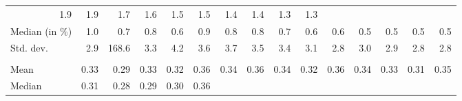 \begin{tabular}{lllllllllllllll}
  \multicolumn{1}{r}{1.9} &
  \multicolumn{1}{r}{1.9} &
  \multicolumn{1}{r}{1.7} &
  \multicolumn{1}{r}{1.6} &
  \multicolumn{1}{r}{1.5} &
  \multicolumn{1}{r}{1.5} &
  \multicolumn{1}{r}{1.4} &
  \multicolumn{1}{r}{1.4} &
  \multicolumn{1}{r}{1.3} &
  \multicolumn{1}{r}{1.3} \\
\multicolumn{1}{l}{\hspace{2em}Median (in $\%$)} &
  \multicolumn{1}{|r}{1.0} &
  \multicolumn{1}{r}{0.7} &
  \multicolumn{1}{r}{0.8} &
  \multicolumn{1}{r}{0.6} &
  \multicolumn{1}{r}{0.9} &
  \multicolumn{1}{r}{0.8} &
  \multicolumn{1}{r}{0.8} &
  \multicolumn{1}{r}{0.7} &
  \multicolumn{1}{r}{0.6} &
  \multicolumn{1}{r}{0.6} &
  \multicolumn{1}{r}{0.5} &
  \multicolumn{1}{r}{0.5} &
  \multicolumn{1}{r}{0.5} &
  \multicolumn{1}{r}{0.5} \\
\multicolumn{1}{l}{\hspace{2em}Std. dev.} &
  \multicolumn{1}{|r}{2.9} &
  \multicolumn{1}{r}{168.6} &
  \multicolumn{1}{r}{3.3} &
  \multicolumn{1}{r}{4.2} &
  \multicolumn{1}{r}{3.6} &
  \multicolumn{1}{r}{3.7} &
  \multicolumn{1}{r}{3.5} &
  \multicolumn{1}{r}{3.4} &
  \multicolumn{1}{r}{3.1} &
  \multicolumn{1}{r}{2.8} &
  \multicolumn{1}{r}{3.0} &
  \multicolumn{1}{r}{2.9} &
  \multicolumn{1}{r}{2.8} &
  \multicolumn{1}{r}{2.8} \\
\multicolumn{1}{l}{\hspace{1em}{\textit{Elasticity} ($\widehat{\beta}$)}} &
  \multicolumn{1}{|r}{} &
  \multicolumn{1}{r}{} &
  \multicolumn{1}{r}{} &
  \multicolumn{1}{r}{} &
  \multicolumn{1}{r}{} &
  \multicolumn{1}{r}{} &
  \multicolumn{1}{r}{} &
  \multicolumn{1}{r}{} &
  \multicolumn{1}{r}{} &
  \multicolumn{1}{r}{} &
  \multicolumn{1}{r}{} &
  \multicolumn{1}{r}{} &
  \multicolumn{1}{r}{} &
  \multicolumn{1}{r}{} \\
\multicolumn{1}{l}{\hspace{2em}Mean} &
  \multicolumn{1}{|r}{0.33} &
  \multicolumn{1}{r}{0.29} &
  \multicolumn{1}{r}{0.33} &
  \multicolumn{1}{r}{0.32} &
  \multicolumn{1}{r}{0.36} &
  \multicolumn{1}{r}{0.34} &
  \multicolumn{1}{r}{0.36} &
  \multicolumn{1}{r}{0.34} &
  \multicolumn{1}{r}{0.32} &
  \multicolumn{1}{r}{0.36} &
  \multicolumn{1}{r}{0.34} &
  \multicolumn{1}{r}{0.33} &
  \multicolumn{1}{r}{0.31} &
  \multicolumn{1}{r}{0.35} \\
\multicolumn{1}{l}{\hspace{2em}Median} &
  \multicolumn{1}{|r}{0.31} &
  \multicolumn{1}{r}{0.28} &
  \multicolumn{1}{r}{0.29} &
  \multicolumn{1}{r}{0.30} &
  \multicolumn{1}{r}{0.36} &

\end{tabular}
